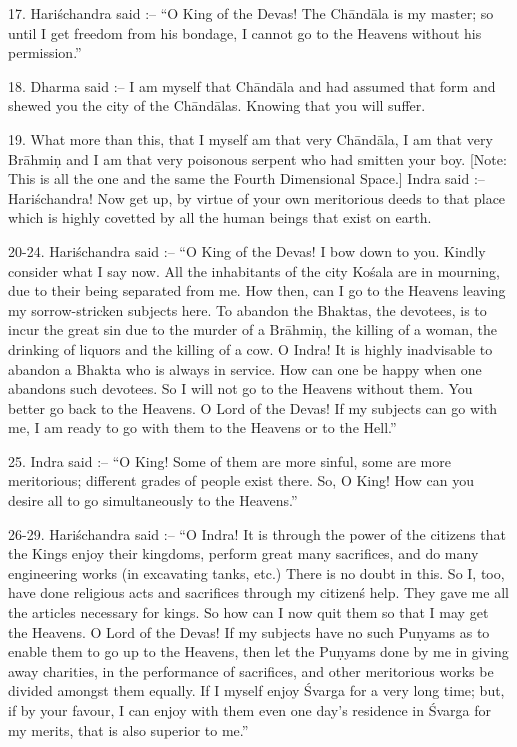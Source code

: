 17. Hari\'schandra said :-- ``O King of the Devas! The Ch\=and\=ala is my master; so until I get freedom from his bondage, I cannot go to the Heavens without his permission.''

18. Dharma said :-- I am myself that Ch\=and\=ala and had assumed that form and shewed you the city of the Ch\=and\=alas. Knowing that you will suffer.

19. What more than this, that I myself am that very Ch\=and\=ala, I am that very Br\=ahmi\d{n} and I am that very poisonous serpent who had smitten your boy. [Note: This is all the one and the same the Fourth Dimensional Space.] Indra said :-- Hari\'schandra! Now get up, by virtue of your own meritorious deeds to that place which is highly covetted by all the human beings that exist on earth.

20-24. Hari\'schandra said :-- ``O King of the Devas! I bow down to you. Kindly consider what I say now. All the inhabitants of the city Ko\'sala are in mourning, due to their being separated from me. How then, can I go to the Heavens leaving my sorrow-stricken subjects here. To abandon the Bhaktas, the devotees, is to incur the great sin due to the murder of a Br\=ahmi\d{n}, the killing of a woman, the drinking of liquors and the killing of a cow. O Indra! It is highly inadvisable to abandon a Bhakta who is always in service. How can one be happy when one abandons such devotees. So I will not go to the Heavens without them. You better go back to the Heavens. O Lord of the Devas! If my subjects can go with me, I am ready to go with them to the Heavens or to the Hell.''

25. Indra said :-- ``O King! Some of them are more sinful, some are more meritorious; different grades of people exist there. So, O King! How can you desire all to go simultaneously to the Heavens.''

26-29. Hari\'schandra said :-- ``O Indra! It is through the power of the citizens that the Kings enjoy their kingdoms, perform great many sacrifices, and do many engineering works (in excavating tanks, etc.) There is no doubt in this. So I, too, have done religious acts and sacrifices through my citizen\'s help. They gave me all the articles necessary for kings. So how can I now quit them so that I may get the Heavens. O Lord of the Devas! If my subjects have no such Pu\d{n}yams as to enable them to go up to the Heavens, then let the Pu\d{n}yams done by me in giving away charities, in the performance of sacrifices, and other meritorious works be divided amongst them equally. If I myself enjoy \'Svarga for a very long time; but, if by your favour, I can enjoy with them even one day's residence in \'Svarga for my merits, that is also superior to me.''

